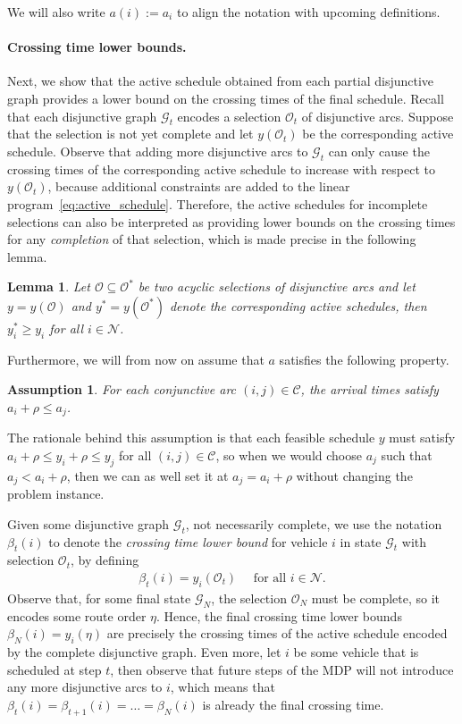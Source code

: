 \documentclass[a4paper]{report}
\theoremstyle{definition}
\theoremstyle{plain}
\newtheorem{lemma}{Lemma}[chapter]
\newtheorem{assump}{Assumption}[chapter]
\newcommand\note[1]{{\color{Navy}#1}}
\begin{document}
\note{We will also write $a(i) := a_i$ to align
the notation with upcoming definitions.}

\paragraph{Crossing time lower bounds.}
Next, we show that the active schedule obtained from each partial disjunctive
graph provides a lower bound on the crossing times of the final schedule.
%
Recall that each disjunctive graph $\mathcal{G}_t$ encodes a selection
$\mathcal{O}_t$ of disjunctive arcs.
%
Suppose that the selection is not yet complete and let $y(\mathcal{O}_t)$ be the
corresponding active schedule.
%
Observe that adding more disjunctive arcs to $\mathcal{G}_t$ can only cause the
crossing times of the corresponding active schedule to increase with respect to
$y(\mathcal{O}_t)$, because additional constraints are added to the linear
program~\eqref{eq:active_schedule}.
%
Therefore, the active schedules for incomplete selections can also be
interpreted as providing lower bounds on the crossing times for any \emph{completion}
of that selection, which is made precise in the following lemma.
%
\begin{lemma}
  Let $\mathcal{O} \subseteq \mathcal{O}^*$ be two acyclic selections of disjunctive
  arcs and let $y = y(\mathcal{O})$ and $y^* = y(\mathcal{O}^{*})$ denote the
  corresponding active schedules, then $y^{*}_i \geq y_i$ for all
  $i \in \mathcal{N}$.
\end{lemma}

Furthermore, we will from now on assume that $a$ satisfies the following property.
\begin{assump}\label{assump:arrivals}
  For each conjunctive arc $(i, j) \in \mathcal{C}$, the arrival times satisfy
  $a_i + \rho \leq a_j$.
\end{assump}
\noindent
The rationale behind this assumption is that each feasible schedule $y$ must
satisfy $a_i + \rho \leq y_i + \rho \leq y_j$ for all $(i,j) \in \mathcal{C}$,
so when we would choose $a_j$ such that $a_j < a_i + \rho$, then we can as well
set it at $a_j = a_i + \rho$ without changing the problem instance.


\noindent
Given some disjunctive graph $\mathcal{G}_t$, not necessarily complete, we use
the notation $\beta_t(i)$ to denote the \emph{crossing time lower bound} for vehicle $i$ in
state $\mathcal{G}_t$ with selection $\mathcal{O}_t$, by defining
\begin{align}
  \beta_t(i) = y_i(\mathcal{O}_t) \quad \text{ for all } i \in \mathcal{N} .
\end{align}
%
Observe that, for some final state $\mathcal{G}_N$, the selection
$\mathcal{O}_N$ must be complete, so it encodes some route order $\eta$. Hence,
the final crossing time lower bounds $\beta_N(i) = y_i(\eta)$ are precisely the
crossing times of the active schedule encoded by the complete disjunctive graph.
%
Even more, let $i$ be some vehicle that is scheduled at step $t$, then observe
that future steps of the MDP will not introduce any more disjunctive arcs to
$i$, which means that $\beta_t(i) = \beta_{t+1}(i) = \dots = \beta_N(i)$ is
already the final crossing time.
\end{document}
